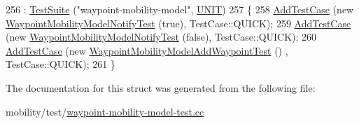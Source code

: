 \begin{DoxyCode}
256                                     : \hyperlink{classns3_1_1TestSuite_a904b0c40583b744d30908aeb94636d1a}{TestSuite} (\textcolor{stringliteral}{"waypoint-mobility-model"}, 
      \hyperlink{classns3_1_1TestSuite_a1ebfcab34ec8161e085e8e3a1855eae0a3885375a3787abf60431f8454b3cadbd}{UNIT})
257   \{
258     \hyperlink{classns3_1_1TestCase_a3718088e3eefd5d6454569d2e0ddd835}{AddTestCase} (\textcolor{keyword}{new} \hyperlink{classWaypointMobilityModelNotifyTest}{WaypointMobilityModelNotifyTest} (\textcolor{keyword}{true}), 
      TestCase::QUICK);
259     \hyperlink{classns3_1_1TestCase_a3718088e3eefd5d6454569d2e0ddd835}{AddTestCase} (\textcolor{keyword}{new} \hyperlink{classWaypointMobilityModelNotifyTest}{WaypointMobilityModelNotifyTest} (\textcolor{keyword}{false}), 
      TestCase::QUICK);
260     \hyperlink{classns3_1_1TestCase_a3718088e3eefd5d6454569d2e0ddd835}{AddTestCase} (\textcolor{keyword}{new} \hyperlink{classWaypointMobilityModelAddWaypointTest}{WaypointMobilityModelAddWaypointTest} ()
      , TestCase::QUICK);
261   \}
\end{DoxyCode}


The documentation for this struct was generated from the following file\+:\begin{DoxyCompactItemize}
\item 
mobility/test/\hyperlink{waypoint-mobility-model-test_8cc}{waypoint-\/mobility-\/model-\/test.\+cc}\end{DoxyCompactItemize}

